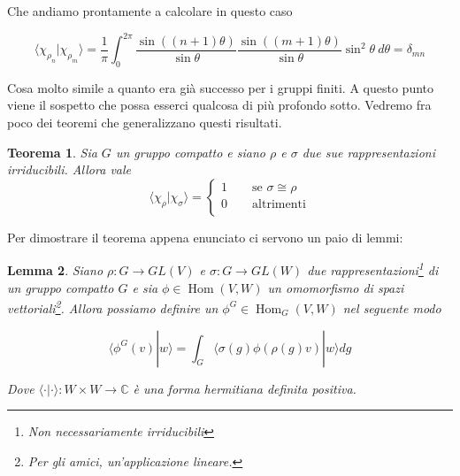 \documentclass[11pt]{article}
\theoremstyle{plain}
\newtheorem{thm}{Teorema}[section]
\newtheorem{lemma}[thm]{Lemma}
\theoremstyle{definition}
\theoremstyle{remark}
\newcommand{\C}{\mathbb{C}}
\newcommand{\dint}{\displaystyle\int}
\DeclareMathOperator{\Hom}{Hom}
\begin{document}
 Che andiamo prontamente a calcolare in questo caso

 \[
 \langle \chi_{\rho_n} | \chi_{\rho_m} \rangle = \dfrac{1}{\pi}\dint_0^{2\pi} \dfrac{\sin((n+1)\theta)}{\sin\theta} \dfrac{\sin((m+1)\theta)}{\sin\theta} \sin^2\theta \ d\theta = \delta_{mn}
 \]


 Cosa molto simile a quanto era già successo per i gruppi finiti. A questo punto viene il sospetto che possa esserci qualcosa di più profondo sotto. Vedremo fra poco dei teoremi che generalizzano questi risultati.








 \begin{thm}
   \label{thm:ortogonalita compatto}
   Sia $G$ un gruppo compatto  e siano $\rho$ e $\sigma$ due sue rappresentazioni irriducibili. Allora vale
   \[
   \langle \chi_\rho | \chi_\sigma \rangle =
   \begin{cases}
     1 \qquad \text{se } \sigma \cong \rho \\
     0 \qquad \text{altrimenti} \\
   \end{cases}
   \]
 \end{thm}

 Per dimostrare il teorema appena enunciato ci servono un paio di lemmi:

 \begin{lemma}
   Siano $\rho: G \to GL(V)$ e $\sigma: G \to GL(W)$ due rappresentazioni\footnote{Non necessariamente irriducibili} di un gruppo compatto $G$ e sia $\phi \in \Hom(V, W)$ un omomorfismo di spazi vettoriali\footnote{Per gli amici, un'applicazione lineare.}. Allora possiamo definire un $\phi^G \in \Hom_G(V, W) $ nel seguente modo

   \[ \langle \phi^G(v) | w \rangle = \dint_G \langle \sigma(g) \phi (\rho(g) v) | w\rangle dg\]

   Dove $\langle \cdot | \cdot \rangle : W \times W \to \C$ è una forma hermitiana definita positiva.

 \end{lemma}
\end{document}
